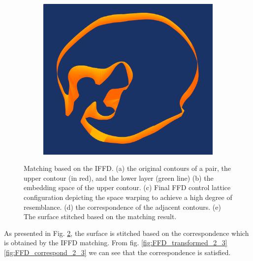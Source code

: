 \documentclass[3p,times]{elsarticle}
\begin{document}
\begin{figure}[ht]
\begin{subfigure}[b]{0.25\textwidth}
\end{subfigure}
~~~~~~~~~~~~~~~~~~~~~
\begin{subfigure}[b]{0.25\textwidth}
\includegraphics[width=\textwidth,height=0.15\textheight]{../picture/FFD_surface_2_3.png}
\caption{}
\label{fig:FFD_surface_2_3}
\end{subfigure}
\caption{Matching based on the IFFD. 
  (a) the original contours of a pair, the upper contour (in red), and the lower layer (green line)
  (b) the embedding space of the upper contour.
  (c) Final FFD control lattice configuration depicting the space
  warping to achieve a high degree of resemblance.
  (d) the correspondence of the adjacent contours.
  (e) The surface stitched based on the matching result.}
\label{fig:FFD_Result}
\end{figure}


As presented in Fig. \ref{fig:FFD_Result}, the surface is stitched
based on the correspondence which is obtained by the IFFD
matching. From fig. \ref{fig:FFD_transformed_2_3} \ref{fig:FFD_correspond_2_3} we
can see that the correspondence is satisfied.
\end{document}
